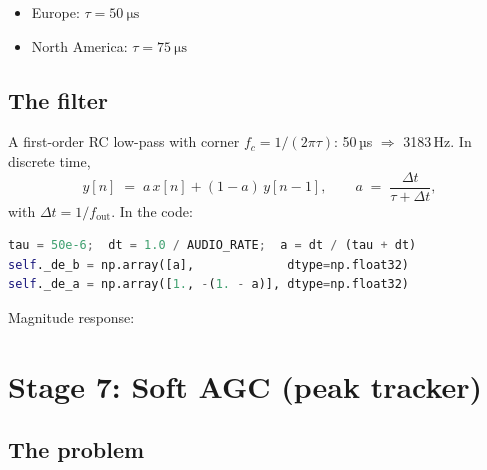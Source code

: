 \documentclass[11pt,a4paper]{article}
\begin{document}
\begin{itemize}
  \item Europe: \(\tau = \SI{50}{\micro\second}\)
  \item North America: \(\tau = \SI{75}{\micro\second}\)
\end{itemize}

\subsection{The filter}

A first-order RC low-pass with corner \(f_c = 1/(2\pi\tau)\):
50\,µs \(\Rightarrow\) 3183\,Hz.  In discrete time,
\begin{equation}
y[n] \;=\; a\,x[n] + (1-a)\,y[n{-}1],
\qquad a \;=\; \frac{\Delta t}{\tau + \Delta t},
\end{equation}
with \(\Delta t = 1/f_{\text{out}}\).  In the code:

\begin{lstlisting}[language=Python]
tau = 50e-6;  dt = 1.0 / AUDIO_RATE;  a = dt / (tau + dt)
self._de_b = np.array([a],             dtype=np.float32)
self._de_a = np.array([1., -(1. - a)], dtype=np.float32)
\end{lstlisting}

Magnitude response:

\begin{center}
\end{center}

\section{Stage 7: Soft AGC (peak tracker)}

\subsection{The problem}
\end{document}
